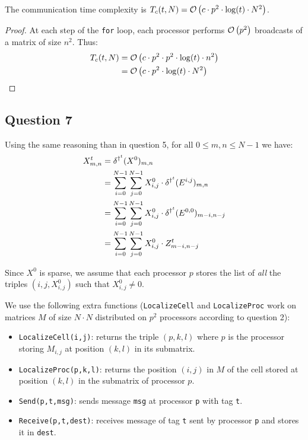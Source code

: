 \begin{prop}
 The communication time complexity is $T_c(t,N) = \mathcal O \left( c \cdot p^2 \cdot \log(t) \cdot N^2 \right)$.
\end{prop}

\begin{proof}
 At each step of the \texttt{for} loop, each processor performs $\mathcal O \left( p^2 \right)$ broadcasts of a matrix of size $n^2$. Thus:
  \[
    \begin{split}
        T_c(t,N) & = \mathcal O \left( c \cdot p^2 \cdot p^2 \cdot \log(t) \cdot n^2 \right) \\
                 & = \mathcal O \left( c \cdot p^2 \cdot \log(t) \cdot N^2 \right)
    \end{split}
 \] 
\end{proof}


\subsection*{Question 7}

Using the same reasoning than in question 5, for all $0 \leq m, n \leq N-1$ we have:
\begin{equation}
 \label{qsevenrel}
 \begin{split}
    X^t_{m,n} & = \delta^{\dag^t} (X^0)_{m,n} \\
              & = \sum_{i=0}^{N-1} \sum_{j=0}^{N-1} X^0_{i,j} \cdot \delta^{\dag^t} (E^{i,j})_{m,n} \\
              & = \sum_{i=0}^{N-1} \sum_{j=0}^{N-1} X^0_{i,j} \cdot \delta^{\dag^t} (E^{0,0})_{m-i,n-j} \\
              & = \sum_{i=0}^{N-1} \sum_{j=0}^{N-1} X^0_{i,j} \cdot Z^t_{m-i,n-j} \\
 \end{split}
\end{equation}

Since $X^0$ is sparse, we assume that each processor $p$ stores the list of \textit{all} the triples $(i,j,X^0_{i,j})$ such that $X^0_{i,j} \neq 0$.

We use the following extra functions (\texttt{LocalizeCell} and \texttt{LocalizeProc} work on matrices $M$ of size $N \cdot N$ distributed on $p^2$ processors according to question 2):
\begin{itemize}
 \item \texttt{LocalizeCell(i,j)}: returns the triple $(p,k,l)$ where $p$ is the processor storing $M_{i,j}$ at position $(k,l)$ in its submatrix.
 \item \texttt{LocalizeProc(p,k,l)}: returns the position $(i,j)$ in $M$ of the cell stored at position $(k,l)$ in the submatrix of processor $p$.
 \item \texttt{Send(p,t,msg)}: sends message \texttt{msg} at processor \texttt{p} with tag \texttt{t}.
 \item \texttt{Receive(p,t,dest)}: receives message of tag \texttt{t} sent by processor \texttt{p} and stores it in \texttt{dest}.
\end{itemize}

